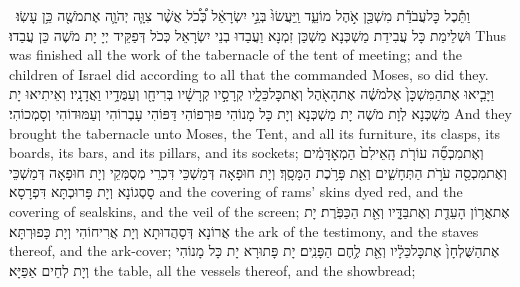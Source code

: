 {וַתֵּ֕כֶל כׇּל\maqqaf עֲבֹדַ֕ת מִשְׁכַּ֖ן אֹ֣הֶל מוֹעֵ֑ד וַֽיַּעֲשׂוּ֙ בְּנֵ֣י יִשְׂרָאֵ֔ל כְּ֠כֹ֠ל אֲשֶׁ֨ר צִוָּ֧ה יְהֹוָ֛ה אֶת\maqqaf מֹשֶׁ֖ה כֵּ֥ן עָשֽׂוּ׃ \petucha }
{וּשְׁלֵימַת כָּל עֲבִידַת מַשְׁכְּנָא מַשְׁכַּן זִמְנָא וַעֲבַדוּ בְנֵי יִשְׂרָאֵל כְּכֹל דְּפַקֵּיד יְיָ יָת מֹשֶׁה כֵּן עֲבַדוּ׃}
{Thus was finished all the work of the tabernacle of the tent of meeting; and the children of Israel did according to all that the \lord\space commanded Moses, so did they.}{}
{וַיָּבִ֤יאוּ אֶת\maqqaf הַמִּשְׁכָּן֙ אֶל\maqqaf מֹשֶׁ֔ה אֶת\maqqaf הָאֹ֖הֶל וְאֶת\maqqaf כׇּל\maqqaf כֵּלָ֑יו קְרָסָ֣יו קְרָשָׁ֔יו בְּרִיחָ֖ו וְעַמֻּדָ֥יו וַאֲדָנָֽיו׃}
{וְאֵיתִיאוּ יָת מַשְׁכְּנָא לְוָת מֹשֶׁה יָת מַשְׁכְּנָא וְיָת כָּל מָנוֹהִי פּוּרְפוֹהִי דַּפּוֹהִי עָבְרוֹהִי וְעַמּוּדוֹהִי וְסָמְכוֹהִי׃}
{And they brought the tabernacle unto Moses, the Tent, and all its furniture, its clasps, its boards, its bars, and its pillars, and its sockets;}{}
{וְאֶת\maqqaf מִכְסֵ֞ה עוֹרֹ֤ת הָֽאֵילִם֙ הַמְאׇדָּמִ֔ים וְאֶת\maqqaf מִכְסֵ֖ה עֹרֹ֣ת הַתְּחָשִׁ֑ים וְאֵ֖ת פָּרֹ֥כֶת הַמָּסָֽךְ׃}
{וְיָת חוּפָאָה דְּמַשְׁכֵּי דִּכְרֵי מְסֻמְּקֵי וְיָת חוּפָאָה דְּמַשְׁכֵּי סָסְגוֹנָא וְיָת פָּרוּכְתָּא דִּפְרָסָא׃}
{and the covering of rams’ skins dyed red, and the covering of sealskins, and the veil of the screen;}{}
{אֶת\maqqaf אֲר֥וֹן הָעֵדֻ֖ת וְאֶת\maqqaf בַּדָּ֑יו וְאֵ֖ת הַכַּפֹּֽרֶת׃}
{יָת אֲרוֹנָא דְּסָהֲדוּתָא וְיָת אֲרִיחוֹהִי וְיָת כָּפוּרְתָּא׃}
{the ark of the testimony, and the staves thereof, and the ark-cover;}{}
{אֶת\maqqaf הַשֻּׁלְחָן֙ אֶת\maqqaf כׇּל\maqqaf כֵּלָ֔יו וְאֵ֖ת לֶ֥חֶם הַפָּנִֽים׃}
{יָת פָּתוּרָא יָת כָּל מָנוֹהִי וְיָת לְחֵים אַפַּיָּא׃}
{the table, all the vessels thereof, and the showbread;}{}
